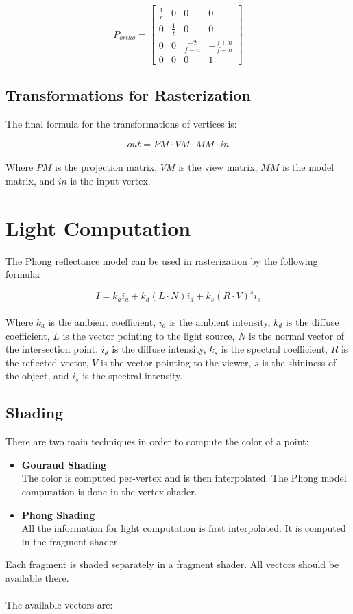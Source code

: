 \documentclass{article}
\begin{document}
\[ P_{ortho} = \begin{bmatrix} \frac{1}{r} & 0 & 0 & 0 \\ 0 & \frac{1}{t} & 0 & 0 \\ 0 & 0 & \frac{-2}{f-n} & -\frac{f+n}{f-n} \\ 0 & 0 & 0 & 1 \end{bmatrix} \]

\subsection{Transformations for Rasterization}
The final formula for the transformations of vertices is:

\[ out = PM \cdot VM \cdot MM \cdot in \] \\
Where $PM$ is the projection matrix, $VM$ is the view matrix, $MM$ is the model matrix, and $in$ is the input vertex.

\section{Light Computation}
The Phong reflectance model can be used in rasterization by the following formula:

\[ I = k_ai_a + k_d (L \cdot N) i_d + k_s (R \cdot V)^s i_s \] \\
Where $k_a$ is the ambient coefficient, $i_a$ is the ambient intensity, $k_d$ is the diffuse coefficient, $L$ is the vector pointing to the light source, $N$ is the normal vector of the intersection point, $i_d$ is the diffuse intensity, $k_s$ is the spectral coefficient, $R$ is the reflected vector, $V$ is the vector pointing to the viewer, $s$ is the shininess of the object, and $i_s$ is the spectral intensity.

\subsection{Shading}
There are two main techniques in order to compute the color of a point:

\begin{itemize}
	\item \textbf{Gouraud Shading}
	\vspace{.2cm} \\
	The color is computed per-vertex and is then interpolated. The Phong model computation is done in the vertex shader.
	
	\item \textbf{Phong Shading}
	\vspace{.2cm} \\
	All the information for light computation is first interpolated. It is computed in the fragment shader.
\end{itemize}
Each fragment is shaded separately in a fragment shader. All vectors should be available there. \\ \\
The available vectors are:
\end{document}
